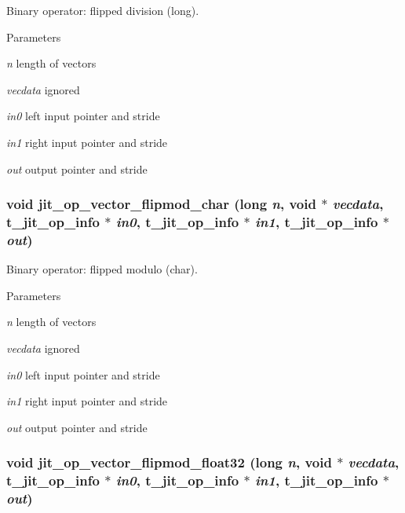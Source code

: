 Binary operator: flipped division (long). 
\begin{DoxyParams}{Parameters}
\item[{\em n}]length of vectors \item[{\em vecdata}]ignored \item[{\em in0}]left input pointer and stride \item[{\em in1}]right input pointer and stride \item[{\em out}]output pointer and stride \end{DoxyParams}
\hypertarget{group__opvecmod_ga0ac36294ad3e20269d31ef23a27efdb9}{
\subsubsection[{jit\_\-op\_\-vector\_\-flipmod\_\-char}]{\setlength{\rightskip}{0pt plus 5cm}void jit\_\-op\_\-vector\_\-flipmod\_\-char (long {\em n}, \/  void $\ast$ {\em vecdata}, \/  {\bf t\_\-jit\_\-op\_\-info} $\ast$ {\em in0}, \/  {\bf t\_\-jit\_\-op\_\-info} $\ast$ {\em in1}, \/  {\bf t\_\-jit\_\-op\_\-info} $\ast$ {\em out})}}
\label{group__opvecmod_ga0ac36294ad3e20269d31ef23a27efdb9}


Binary operator: flipped modulo (char). 
\begin{DoxyParams}{Parameters}
\item[{\em n}]length of vectors \item[{\em vecdata}]ignored \item[{\em in0}]left input pointer and stride \item[{\em in1}]right input pointer and stride \item[{\em out}]output pointer and stride \end{DoxyParams}
\hypertarget{group__opvecmod_gadbf380ca71e3bb2f38793b38e7b10786}{
\subsubsection[{jit\_\-op\_\-vector\_\-flipmod\_\-float32}]{\setlength{\rightskip}{0pt plus 5cm}void jit\_\-op\_\-vector\_\-flipmod\_\-float32 (long {\em n}, \/  void $\ast$ {\em vecdata}, \/  {\bf t\_\-jit\_\-op\_\-info} $\ast$ {\em in0}, \/  {\bf t\_\-jit\_\-op\_\-info} $\ast$ {\em in1}, \/  {\bf t\_\-jit\_\-op\_\-info} $\ast$ {\em out})}}
\label{group__opvecmod_gadbf380ca71e3bb2f38793b38e7b10786}


